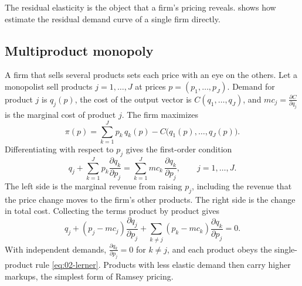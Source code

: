 The residual elasticity is the object that a firm's pricing reveals.  shows how
\citet{BakerBresnahan1988} estimate the residual demand curve of a single firm directly.

\subsection{Multiproduct monopoly}\label{sec:02-multiproduct}

A firm that sells several products sets each price with an eye on the others. Let a monopolist sell products
$j = 1, \dots, J$ at prices $p = (p_1, \dots, p_J)$. Demand for product $j$ is $q_j(p)$, the cost of the output
vector is $C(q_1, \dots, q_J)$, and $mc_j = \frac{\partial C}{\partial q_j}$ is the marginal cost of product $j$. The
firm maximizes
\[
  \pi(p) = \sum_{k=1}^J p_k\, q_k(p) - C\bigl(q_1(p), \dots, q_J(p)\bigr) .
\]
Differentiating with respect to $p_j$ gives the first-order condition \citep[sec.~1.1.2, eq.~(1.6)]{Tirole1988}
\begin{equation}\label{eq:02-multi-foc}
  q_j + \sum_{k=1}^J p_k\frac{\partial q_k}{\partial p_j} = \sum_{k=1}^J mc_k\,\frac{\partial q_k}{\partial p_j},
  \qquad j = 1, \dots, J .
\end{equation}
The left side is the marginal revenue from raising $p_j$, including the revenue that the price change moves to the
firm's other products. The right side is the change in total cost. Collecting the terms product by product gives
\begin{equation}\label{eq:02-multi-foc-margin}
  q_j + (p_j - mc_j)\frac{\partial q_j}{\partial p_j} + \sum_{k \ne j}(p_k - mc_k)\frac{\partial q_k}{\partial p_j}
  = 0 .
\end{equation}
With independent demands, $\frac{\partial q_k}{\partial p_j} = 0$ for $k \ne j$, and each product obeys the
single-product rule \eqref{eq:02-lerner}. Products with less elastic demand then carry higher markups, the simplest
form of Ramsey pricing.

